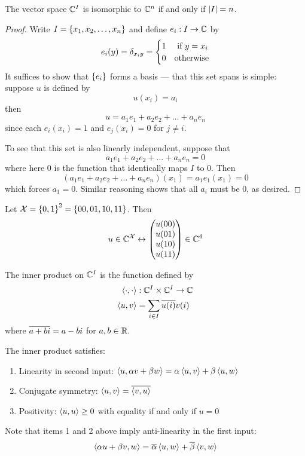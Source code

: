 \begin{theorem}
    The vector space $\mathbb{C}^I$ is isomorphic to $\mathbb{C}^n$ if and
    only if $\left\lvert I\right\rvert = n$.
\end{theorem}

\begin{proof}
    Write $I = \left\lbrace x_1, x_2, \dots, x_n\right\rbrace$ and define
    $e_i: I \to \mathbb{C}$ by
    \[e_i(y) = \delta_{x_i y} = \begin{cases}1 & \hbox{ if $y=x_i$}\\0 & \hbox{otherwise}\end{cases}\]
    It suffices to show that $\left\lbrace e_i\right\rbrace$ forms a basis --- that this set spans is simple:
    suppose $u$ is defined by
    \[u(x_i) = a_i\]
    then
    \[u = a_1e_1 + a_2e_2 + \dots + a_ne_n\]
    since each $e_i(x_i) = 1$ and $e_j(x_i) = 0$ for $j \neq i$.

    To see that this set is also linearly independent, suppose that
    \[a_1e_1 + a_2e_2 + \dots + a_ne_n = 0\]
    where here 0 is the function that identically maps $I$ to 0. Then
    \[\left(a_1e_1 + a_2e_2 + \dots + a_ne_n\right)(x_1) = a_1e_1(x_1) = 0\]
    which forces $a_1 = 0$. Similar reasoning shows that all $a_i$ must be 0,
    as desired.
\end{proof}

\begin{example}
    Let $\mathcal{X} = \left\lbrace0, 1\right\rbrace^2 = \left\lbrace00, 01, 10, 11\right\rbrace$. Then
    \[u \in \mathbb{C}^{\mathcal{X}} \leftrightarrow \begin{pmatrix}u(00)\\u(01)\\u(10)\\u(11)\end{pmatrix}\in\mathbb{C}^4\]
\end{example}

\begin{definition}
    The inner product on $\mathbb{C}^I$ is the function defined by
    \begin{align*}
        \left\langle \cdot, \cdot\right\rangle & :\mathbb{C}^I \times \mathbb{C}^I \to \mathbb{C} \\
        \left\langle u, v\right\rangle         & = \sum_{i\in I}\overline{u(i)}v(i)
    \end{align*}
    where $\overline{a + bi} = a - bi$ for $a, b\in\mathbb{R}$.

    The inner product satisfies:
    \begin{enumerate}[label=(\arabic*)]
        \item Linearity in second input: $\left\langle u, \alpha v + \beta w\right\rangle = \alpha\left\langle u, v\right\rangle + \beta\left\langle u, w\right\rangle$
        \item Conjugate symmetry: $\left\langle u, v\right\rangle = \overline{\left\langle v, u\right\rangle}$
        \item Positivity: $\left\langle u, u\right\rangle \geq 0$ with equality if and only if $u = 0$
    \end{enumerate}
\end{definition}
Note that items 1 and 2 above imply anti-linearity in the first input:
\[\left\langle \alpha u + \beta v, w\right\rangle = \overline{\alpha}\left\langle u, w\right\rangle + \overline{\beta}\left\langle v, w\right\rangle\]

